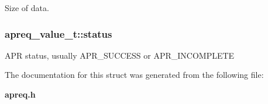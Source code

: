 Size of data. 
\subsubsection{ apreq\_\-value\_\-t::status}\label{structapreq__value__t_m1}


APR status, usually APR\_\-SUCCESS or APR\_\-INCOMPLETE 

The documentation for this struct was generated from the following file:\begin{CompactItemize}
\item 
{\bf apreq.h}\end{CompactItemize}
